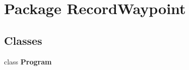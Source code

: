 \hypertarget{namespace_record_waypoint}{\section{Package Record\-Waypoint}
\label{namespace_record_waypoint}
}
\subsection*{Classes}
\begin{DoxyCompactItemize}
\item 
class {\bfseries Program}
\end{DoxyCompactItemize}
